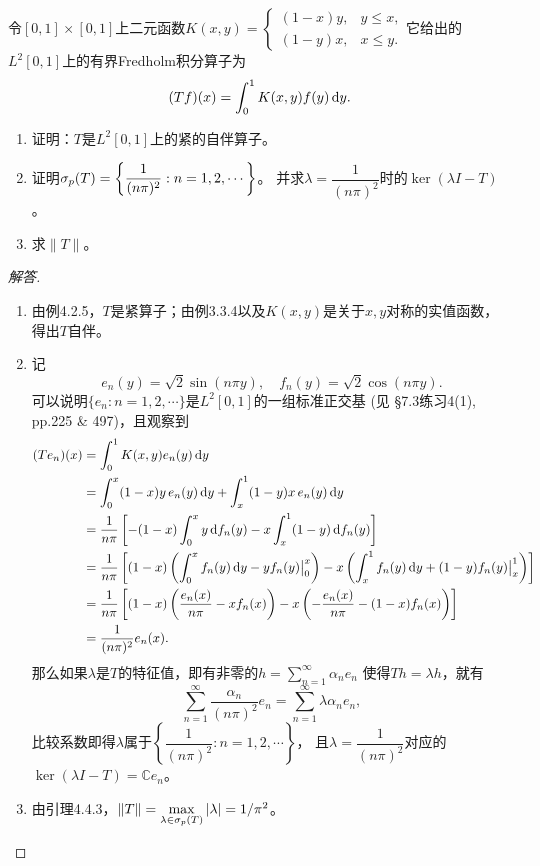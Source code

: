 \begin{12}
    令$[0,1]\times[0,1]$上二元函数$K(x,y)=\begin{cases}(1-x)y,&y \leqslant x,\\
    (1-y)x,&x \leqslant y.\end{cases}$它给出的$L^2[0,1]$上的有界Fredholm积分算子为
    \[(Tf)(x)=\int_0^1K(x,y)f(y)\,{\rm d}y.\]
    \begin{enumerate}[label=(\roman*)]
        \item 证明：$T$是$L^2[0,1]$上的紧的自伴算子。
        \item 证明$\sigma_p(T)=\left\{\dfrac{1}{(n\pi)^2}:n=1,2,\cdots\right\}$。
        并求$\lambda=\dfrac{1}{(n\pi)^2}$时的$\ker(\lambda I-T)$。
        \item 求$\|T\|$。
    \end{enumerate}
\end{12}
\begin{proof}[解答]
    \begin{enumerate}[label=(\roman*)]
    \item 由例4.2.5，$T$是紧算子；由例3.3.4以及$K(x,y)$是关于$x,y$对称的实值函数，得出$T$自伴。
    \item 记
    \[e_n(y)=\sqrt{2}\sin(n\pi y), \quad f_n(y)=\sqrt{2}\cos(n\pi y).\]
    可以说明$\{e_n:n=1,2,\cdots\}$是$L^2[0,1]$的一组标准正交基
    (见\cite{Xu} \S7.3练习4(1), pp.225 & 497)，且观察到
    \begin{align*}
        (Te_n)(x)&=\int_0^1K(x,y)e_n(y)\,{\rm d}y\\
        &=\int_0^x(1-x)y\,e_n(y)\,{\rm d}y+\int_x^1(1-y)x\,e_n(y)\,{\rm d}y\\
        &=\frac{1}{n\pi}\left[-(1-x)\int_0^xy\,{\rm d}f_n(y)
        -x\int_x^1(1-y)\,{\rm d}f_n(y)\right]\\
        &=\frac{1}{n\pi}\left[(1-x)\left(\int_0^xf_n(y)\,{\rm d}y-yf_n(y)\big|_0^x\right)
        -x\left(\int_x^1f_n(y)\,{\rm d}y+(1-y)f_n(y)\big|_x^1\right)\right]\\
        &=\frac{1}{n\pi}\left[(1-x)\left(\frac{e_n(x)}{n\pi}-xf_n(x)\right)
        -x\left(-\frac{e_n(x)}{n\pi}-(1-x)f_n(x)\right)\right]\\
        &=\frac{1}{(n\pi)^2}e_n(x).
    \end{align*}
    那么如果$\lambda$是$T$的特征值，即有非零的$\displaystyle h=\sum_{n=1}^\infty \alpha_ne_n$
    使得$Th=\lambda h$，就有
    \[\sum_{n=1}^\infty \frac{\alpha_n}{(n\pi)^2}e_n=\sum_{n=1}^\infty \lambda\alpha_ne_n,\]
    比较系数即得$\lambda$属于$\left\{\dfrac{1}{(n\pi)^2}:n=1,2,\cdots\right\}$，
    且$\lambda=\dfrac{1}{(n\pi)^2}$对应的$\ker(\lambda I-T)=\mathbb{C}e_n$。
    \item 由引理4.4.3，$\|T\|=\max\limits_{\lambda\in\sigma_p(T)}|\lambda|=1/\pi^2$。\qedhere
    \end{enumerate}
\end{proof}
